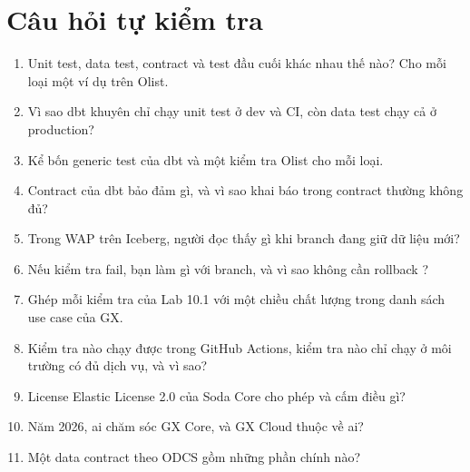 \section{Câu hỏi tự kiểm tra}
\begin{enumerate}
  \item Unit test, data test, contract và test đầu cuối khác nhau thế nào? Cho mỗi loại một ví dụ trên Olist.
  \item Vì sao dbt khuyên chỉ chạy unit test ở dev và CI, còn data test chạy cả ở production?
  \item Kể bốn generic test của dbt và một kiểm tra Olist cho mỗi loại.
  \item Contract của dbt bảo đảm gì, và vì sao khai báo  trong contract thường không đủ?
  \item Trong WAP trên Iceberg, người đọc  thấy gì khi branch đang giữ dữ liệu mới?
  \item Nếu kiểm tra fail, bạn làm gì với branch, và vì sao không cần rollback ?
  \item Ghép mỗi kiểm tra của Lab 10.1 với một chiều chất lượng trong danh sách use case của GX.
  \item Kiểm tra nào chạy được trong GitHub Actions, kiểm tra nào chỉ chạy ở môi trường có đủ dịch vụ, và vì sao?
  \item License Elastic License 2.0 của Soda Core cho phép và cấm điều gì?
  \item Năm 2026, ai chăm sóc GX Core, và GX Cloud thuộc về ai?
  \item Một data contract theo ODCS gồm những phần chính nào?
\end{enumerate}

